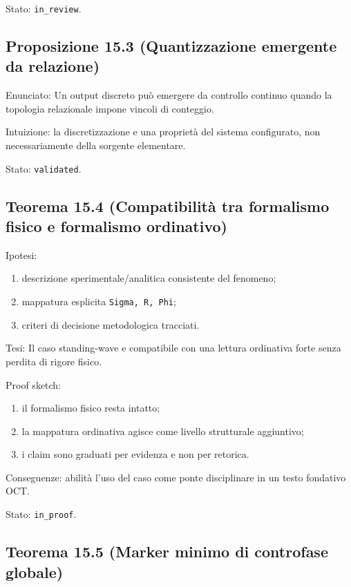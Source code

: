 Stato: \texttt{in\_review}.

\subsection{Proposizione 15.3 (Quantizzazione emergente da relazione)}

Enunciato:
Un output discreto può emergere da controllo continuo quando la topologia relazionale impone vincoli di conteggio.

Intuizione:
la discretizzazione e una proprietà del sistema configurato, non necessariamente della sorgente elementare.

Stato: \texttt{validated}.

\subsection{Teorema 15.4 (Compatibilità tra formalismo fisico e formalismo ordinativo)}

Ipotesi:

\begin{enumerate}
\def\labelenumi{\arabic{enumi}.}
\tightlist
\item
  descrizione sperimentale/analitica consistente del fenomeno;
\item
  mappatura esplicita \texttt{Sigma,\ R,\ Phi};
\item
  criteri di decisione metodologica tracciati.
\end{enumerate}

Tesi:
Il caso standing-wave e compatibile con una lettura ordinativa forte senza perdita di rigore fisico.

Proof sketch:

\begin{enumerate}
\def\labelenumi{\arabic{enumi}.}
\tightlist
\item
  il formalismo fisico resta intatto;
\item
  la mappatura ordinativa agisce come livello strutturale aggiuntivo;
\item
  i claim sono graduati per evidenza e non per retorica.
\end{enumerate}

Conseguenze:
abilità l'uso del caso come ponte disciplinare in un testo fondativo OCT.

Stato: \texttt{in\_proof}.

\subsection{Teorema 15.5 (Marker minimo di controfase globale)}

